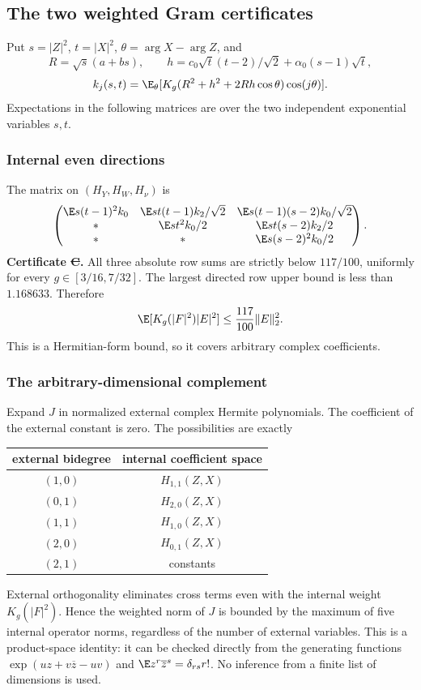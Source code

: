 \subsection{The two weighted Gram certificates}
Put $s=|Z|^2$, $t=|X|^2$, $\theta=\arg X-\arg Z$, and
\[
 R=\sqrt s(a+bs),\qquad h=c_0\sqrt t(t-2)/\sqrt2+\alpha_0(s-1)\sqrt t,
\]
\[
 k_j(s,t)=\E_\theta[K_g(R^2+h^2+2Rh\cos\theta)\cos(j\theta)].
\]
Expectations in the following matrices are over the two independent exponential variables $s,t$.

\subsubsection{Internal even directions}
The matrix on $(H_Y,H_W,H_\nu)$ is
\[
 \begin{pmatrix}
 \E s(t-1)^2k_0&\E st(t-1)k_2/\sqrt2&\E s(t-1)(s-2)k_0/\sqrt2\\
 *&\E st^2k_0/2&\E st(s-2)k_2/2\\
 *&*&\E s(s-2)^2k_0/2
 \end{pmatrix}.
\]
\textbf{Certificate \st{C}.} All three absolute row sums are strictly below $117/100$, uniformly for every $g\in[3/16,7/32]$. The largest directed row upper bound is less than $1.168633$. Therefore
\[
 \E[K_g(|F|^2)|E|^2]\le\frac{117}{100}\|E\|_2^2.
\]
This is a Hermitian-form bound, so it covers arbitrary complex coefficients.

\subsubsection{The arbitrary-dimensional complement}
Expand $J$ in normalized external complex Hermite polynomials. The coefficient of the external constant is zero. The possibilities are exactly
\begin{center}
\begin{tabular}{cc}\toprule
external bidegree & internal coefficient space\\\midrule
$(1,0)$ & $H_{1,1}(Z,X)$\\
$(0,1)$ & $H_{2,0}(Z,X)$\\
$(1,1)$ & $H_{1,0}(Z,X)$\\
$(2,0)$ & $H_{0,1}(Z,X)$\\
$(2,1)$ & constants\\\bottomrule
\end{tabular}
\end{center}
External orthogonality eliminates cross terms even with the internal weight $K_g(|F|^2)$. Hence the weighted norm of $J$ is bounded by the maximum of five internal operator norms, regardless of the number of external variables. This is a product-space identity: it can be checked directly from the generating functions $\exp(uz+v\overline z-uv)$ and $\E z^r\overline z^s=\delta_{rs}r!$. No inference from a finite list of dimensions is used.

